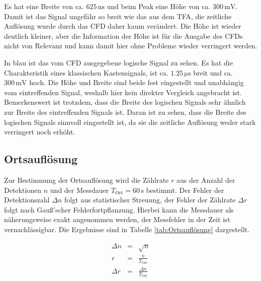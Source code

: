\documentclass[12pt,a4paper]{scrartcl}
\numberwithin{equation}{section} %
\begin{document}
Es hat eine Breite von ca. $625 \mathrm{\, ns}$ und beim Peak eine Höhe von ca. $300 \mathrm{\, mV}$. Damit ist das Signal ungefähr so breit wie das aus dem TFA, die zeitliche Auflösung wurde durch das CFD  daher kaum verändert. Die Höhe ist wieder deutlich kleiner, aber die Information der Höhe ist für die Ausgabe des CFDs nicht von Relevanz und kann damit hier ohne Probleme wieder verringert werden.

In blau ist das vom CFD ausgegebene logische Signal zu sehen. Es hat die Charakteristik eines klassischen Kastensignals, ist ca. $1.25 \mathrm{\, \mu s}$ breit und ca. $300 \mathrm{\, mV}$ hoch. Die Höhe und Breite sind beide fest eingestellt und unabhängig vom eintreffenden Signal, weshalb hier kein direkter Vergleich angebracht ist. Bemerkenswert ist trotzdem, dass die Breite des logischen Signals sehr ähnlich zur Breite des eintreffenden Signals ist. Daran ist zu sehen, dass die Breite des logischen Signals sinnvoll eingestellt ist, da sie die zeitliche Auflösung weder stark verringert noch erhöht.

\hypertarget{auswertung-ortsaufluxf6sung}{\subsection{Ortsauflösung}\label{auswertung-ortsaufluxf6sung}}
Zur Bestimmung der Ortsauflösung wird die Zählrate $r$ aus der Anzahl der Detektionen $n$ und der Messdauer $T_\mathrm{Ort}=60\,\mathrm{s}$ bestimmt. Der Fehler der Detektionszahl $\Delta n$ folgt aus statistischer Streuung, der Fehler der Zählrate $\Delta r$ folgt nach Gauß'scher Fehlerfortpflanzung. Hierbei kann die Messdauer als näherungsweise exakt angenommen werden, der Messfehler in der Zeit ist vernachlässigbar. Die Ergebnisse sind in Tabelle \ref{tab:Ortsauflösung} dargestellt.

\begin{eqnarray}
	\Delta n &=& \sqrt{n} \label{eq:Delta n} \\
	r &=& \frac{n}{T_\mathrm{Ort}} \label{eq:Zählrate} \\
	\Delta r &=& \frac{\Delta n}{T_\mathrm{Ort}} \label{eq:ZählrateFehler}
\end{eqnarray}
\end{document}
